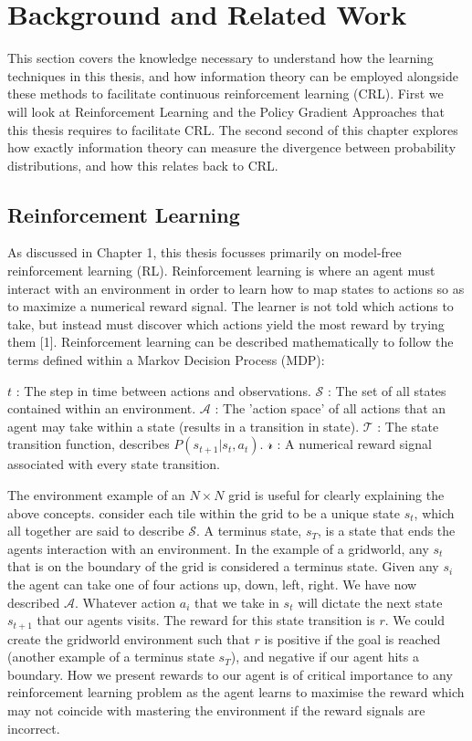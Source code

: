 \chapter{Background and Related Work}

This section covers the knowledge necessary to understand how the learning techniques in this thesis, and how information theory can be employed alongside these methods to facilitate continuous reinforcement learning (CRL). First we will look at Reinforcement Learning and the Policy Gradient Approaches that this thesis requires to facilitate CRL. The second second of this chapter explores how exactly information theory can measure the divergence between probability distributions, and how this relates back to CRL.

\section{Reinforcement Learning}
As discussed in Chapter 1, this thesis focusses primarily on model-free reinforcement learning (RL). Reinforcement learning is where an agent must interact with an environment in order to learn how to map states to actions so as to maximize a numerical reward signal. The learner is not told which actions to take, but instead must discover which actions yield the most reward by trying them [1].  Reinforcement learning can be described mathematically to follow the terms defined within a Markov Decision Process (MDP):
 \begin{itemize}
$t$ : The step in time between actions and observations. 
$\mathcal{S}$ : The set of all states contained within an environment.
$\mathcal{A}$ : The 'action space' of all actions that an agent may take within a state (results in a transition in state).
$\mathcal{T}$ : The state transition function, describes $P(s_{t+1} | s_t, a_t)$.
$\mathcal{r}$ :  A numerical reward signal associated with every state transition. 
\end{itemize}

The environment example of an $N\times N$ grid is useful for clearly explaining the above concepts. consider each tile within the grid to be a unique state $s_t$, which all together are said to describe $\mathcal{S}$. A terminus state, $s_T$, is a state that ends the agents interaction with an environment. In the example of a gridworld, any $s_t$ that is on the boundary of the grid is considered a terminus state. Given any $s_i$ the agent can take one of four actions {up, down, left, right}. We have now described $\mathcal{A}$. Whatever action $a_i$ that we take in $s_t$ will dictate the next state $s_{t+1}$ that our agents visits. The reward for this state transition is $r$. We could create the gridworld environment such that $r$ is positive if the goal is reached (another example of a terminus state $s_T$), and negative if our agent hits a boundary. How we present rewards to our agent is of critical importance to any reinforcement learning problem as the agent learns to maximise the reward which may not coincide with mastering the environment if the reward signals are incorrect.

